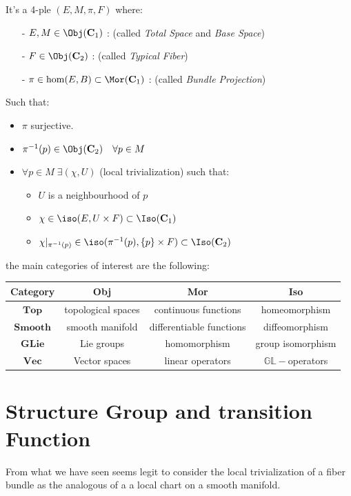 \documentclass[a4paper,12pt]{scrartcl}    %
\begin{document}
\begin{definition}\label{CategoryBundle}
It's a 4-ple $(E,M,\pi,F)$ where:
\begin{itemize}
\item[-] $E, M \in \Obj(\mathbf{C}_{1})$ : (called \emph{Total Space} and \emph{Base Space})
\item[-] $F \in \Obj(\mathbf{C}_{2})$ : (called \emph{Typical Fiber})
\item[-] $\pi \in \hom(E,B) \subset \Mor(\mathbf{C}_{1})$ : (called \emph{Bundle Projection})
\end{itemize}
Such that:
\begin{itemize}
\item $\pi$ surjective.
\item $\pi^{-1} (p) \in \Obj(\mathbf{C}_{2}) \quad \forall p \in M $
\item $\forall p \in M \; \exists (\chi,U)$ (local trivialization) such that:
	\begin{itemize}
	\item $U$ is a neighbourhood of $p$
	\item $\chi \in \iso(E,U\times F)\subset \Iso(\mathbf{C}_{1})$
	\item $\chi \vert_{\pi^{-1}(p)} \in \iso(\pi^{-1}(p),\{p\}\times F)\subset \Iso(\mathbf{C}_{2}) $
	\end{itemize}
\end{itemize}
\end{definition}
the main categories of interest are the following:

\begin{tabular}{|c|c|c|c|}
\hline 
Category & Obj & Mor & Iso \\ 
\hline 
$\mathbf{Top}$ & topological spaces & continuous functions & homeomorphism \\ 
$\mathbf{Smooth}$ & smooth manifold & differentiable functions & diffeomorphism \\ 
$\mathbf{GLie}$ & Lie groups & homomorphism & group isomorphism \\ 
$\mathbf{Vec}$ & Vector spaces & linear operators & $\mathbb{GL}-$operators \\ 
\hline 
\end{tabular} 



\newpage
\section{Structure Group and transition Function}
From what we have seen seems legit to consider the local trivialization of a fiber bundle as the analogous of a a local chart on a smooth manifold.
\end{document}
